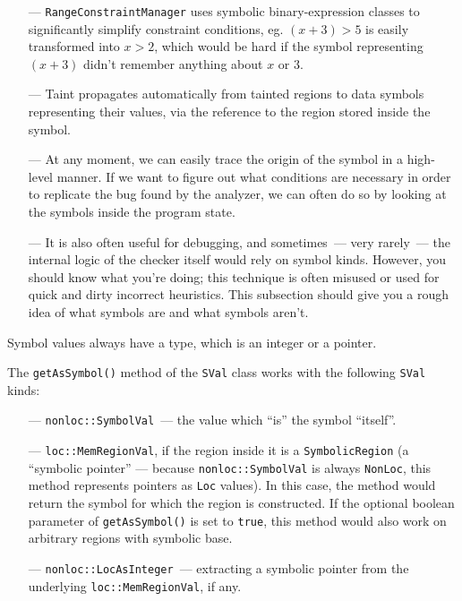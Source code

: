 \documentclass[a4paper,12pt]{article}
\begin{document}
\begin{itemize}
\item[---] \lstinline|RangeConstraintManager| uses symbolic binary-expression classes to significantly simplify const\-raint conditions, eg. $(x + 3) > 5$ is easily transformed into $x > 2$, which would be hard if the symbol representing $(x + 3)$ didn't remember anything about $x$ or $3$.
\item[---] Taint propagates automatically from tainted regions to data symbols representing their values, via the reference to the region stored inside the symbol.
\item[---] At any moment, we can easily trace the origin of the symbol in a high-level manner. If we want to figure out what conditions are necessary in order to replicate the bug found by the analyzer, we can often do so by looking at the symbols inside the program state.
\item[---] It is also often useful for debugging, and sometimes~--- very rarely~--- the internal logic of the checker itself would rely on symbol kinds. However, you should know what you're doing; this technique is often misused or used for quick and dirty incorrect heuristics. This subsection should give you a rough idea of what symbols are and what symbols aren't.
\end{itemize}

Symbol values always have a type, which is an integer or a pointer. 

The \lstinline|getAsSymbol()| method of the \lstinline|SVal| class works with the following \lstinline|SVal| kinds:
\begin{enumerate}
\item[---]\lstinline|nonloc::SymbolVal|~--- the value which ``is'' the symbol ``itself''.
\item[---]\lstinline|loc::MemRegionVal|, if the region inside it is a \lstinline|SymbolicRegion| (a ``symbolic pointer'' --- because \lstinline|nonloc::SymbolVal| is always \lstinline|NonLoc|, this method represents pointers as \lstinline|Loc| values). In this case, the method would return the symbol for which the region is constructed. If the optional boolean parameter of \lstinline|getAsSymbol()| is set to \lstinline|true|, this method would also work on arbitrary regions with symbolic base.
\item[---]\lstinline|nonloc::LocAsInteger|~--- extracting a symbolic pointer from the underlying \lstinline|loc::MemRegionVal|, if any.
\end{enumerate}
\end{document}
